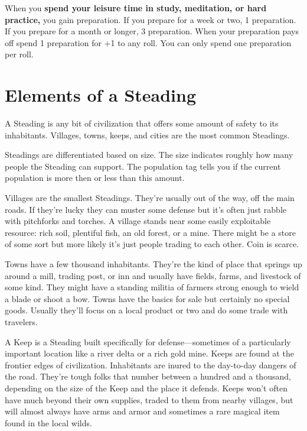 When you {\bf spend your leisure time in study, meditation, or hard practice,}  you gain preparation. If you prepare for a week or two, 1 preparation. If you prepare for a month or longer, 3 preparation. When your preparation pays off spend 1 preparation for +1 to any roll. You can only spend one preparation per roll.

       
\section{Elements of a Steading}   
       

A Steading is any bit of civilization that offers some amount of safety to its inhabitants. Villages, towns, keeps, and cities are the most common Steadings.

       

Steadings are differentiated based on size. The size indicates roughly how many people the Steading can support. The population tag tells you if the current population is more then or less than this amount.

       

Villages are the smallest Steadings. They're usually out of the way, off the main roads. If they're lucky they can muster some defense but it's often just rabble with pitchforks and torches. A village stands near some easily exploitable resource: rich soil, plentiful fish, an old forest, or a mine. There might be a store of some sort but more likely it's just people trading to each other. Coin is scarce.

       

Towns have a few thousand inhabitants. They're the kind of place that springs up around a mill, trading post, or inn and usually have fields, farms, and livestock of some kind. They might have a standing militia of farmers strong enough to wield a blade or shoot a bow. Towns have the basics for sale but certainly no special goods. Usually they'll focus on a local product or two and do some trade with travelers.

       

A Keep is a Steading built specifically for defense—sometimes of a particularly important location like a river delta or a rich gold mine. Keeps are found at the frontier edges of civilization. Inhabitants are inured to the day-to-day dangers of the road. They're tough folks that number between a hundred and a thousand, depending on the size of the Keep and the place it defends. Keeps won't often have much beyond their own supplies, traded to them from nearby villages, but will almost always have arms and armor and sometimes a rare magical item found in the local wilds.


